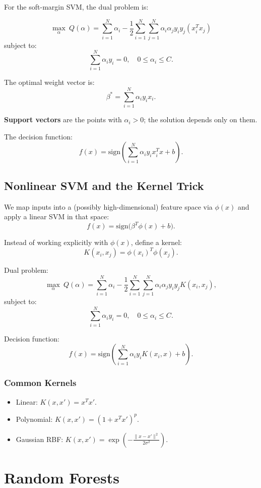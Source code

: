\documentclass[11pt]{article}
\begin{document}
For the soft-margin SVM, the dual problem is:

\[
    \max_{\alpha} \ Q(\alpha) =
    \sum_{i=1}^N \alpha_i
    - \frac{1}{2}\sum_{i=1}^N\sum_{j=1}^N \alpha_i \alpha_j y_i y_j (x_i^T x_j)
\]
subject to:
\[
    \sum_{i=1}^N \alpha_i y_i = 0,\quad 0 \le \alpha_i \le C.
\]

The optimal weight vector is:
\[
    \beta^* = \sum_{i=1}^N \alpha_i y_i x_i.
\]

\textbf{Support vectors} are the points with $\alpha_i > 0$; the solution depends only on them.

The decision function:
\[
    f(x) = \text{sign}\left( \sum_{i=1}^N \alpha_i y_i x_i^T x + b \right).
\]

\subsection{Nonlinear SVM and the Kernel Trick}

We map inputs into a (possibly high-dimensional) feature space via $\phi(x)$ and apply a linear SVM in that space:
\[
    f(x) = \text{sign}\big(\beta^T \phi(x) + b\big).
\]

Instead of working explicitly with $\phi(x)$, define a kernel:
\[
    K(x_i, x_j) = \phi(x_i)^T \phi(x_j).
\]

Dual problem:
\[
    \max_{\alpha} \ Q(\alpha) =
    \sum_{i=1}^N \alpha_i
    - \frac{1}{2}\sum_{i=1}^N\sum_{j=1}^N \alpha_i \alpha_j y_i y_j K(x_i, x_j),
\]
subject to:
\[
    \sum_{i=1}^N \alpha_i y_i = 0,\quad 0 \le \alpha_i \le C.
\]

Decision function:
\[
    f(x) = \text{sign}\left( \sum_{i=1}^N \alpha_i y_i K(x_i, x) + b \right).
\]

\subsubsection*{Common Kernels}

\begin{itemize}
    \item Linear: $K(x,x') = x^T x'$.
    \item Polynomial: $K(x,x') = (1 + x^T x')^p$.
    \item Gaussian RBF: $K(x,x') = \exp\left(-\frac{\|x - x'\|^2}{2\sigma^2}\right)$.
\end{itemize}

\section{Random Forests}
\end{document}
